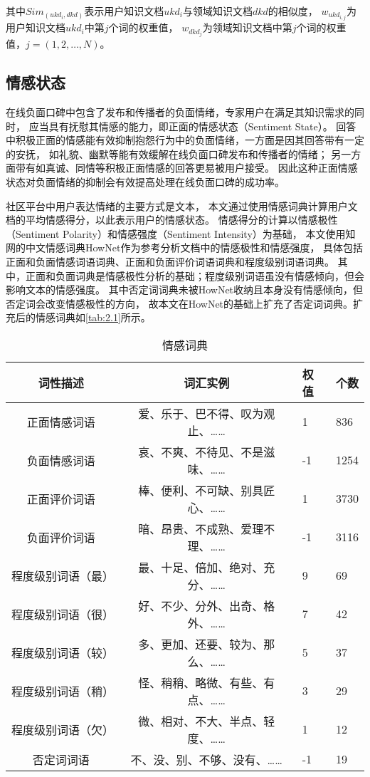 其中$Sim_{(ukd_i,dkd)}$表示用户知识文档$ukd_i$与领域知识文档$dkd$的相似度，
$w_{ { ukd_{i,j} } }$为用户知识文档$ukd_i$中第$j$个词的权重值，
$w_{ { dkd_j } }$为领域知识文档中第$j$个词的权重值，$j=(1,2,\ldots,N)$。

\subsection{情感状态}\label{subsection:2.2.2}

在线负面口碑中包含了发布和传播者的负面情绪，专家用户在满足其知识需求的同时，
应当具有抚慰其情感的能力，即正面的情感状态（Sentiment State）。
回答中积极正面的情感能有效抑制抱怨行为中的负面情绪，一方面是因其回答带有一定的安抚，
如礼貌、幽默等能有效缓解在线负面口碑发布和传播者的情绪；
另一方面带有如真诚、同情等积极正面情感的回答更易被用户接受。
因此这种正面情感状态对负面情绪的抑制会有效提高处理在线负面口碑的成功率\cite{kim2007best}。

社区平台中用户表达情绪的主要方式是文本，
本文通过使用情感词典计算用户文档的平均情感得分，以此表示用户的情感状态。
情感得分的计算以情感极性（Sentiment Polarity）和情感强度（Sentiment Intensity）为基础，
本文使用知网的中文情感词典HowNet作为参考分析文档中的情感极性和情感强度，
具体包括正面和负面情感词语词典、正面和负面评价词语词典和程度级别词语词典。
其中，正面和负面词典是情感极性分析的基础；程度级别词语虽没有情感倾向，但会影响文本的情感强度。
其中否定词词典未被HowNet收纳且本身没有情感倾向，但否定词会改变情感极性的方向，
故本文在HowNet的基础上扩充了否定词词典。扩充后的情感词典如\autoref{tab:2.1}所示。
\begin{table}[ht]
    \centering
    \caption{情感词典}\label{tab:2.1}
    \vskip -10pt
    \begin{tabularx}{\textwidth}{ccYY}
    \toprule
    词性描述 & 词汇实例 & 权值 & 个数\\
    \midrule
    正面情感词语 & 爱、乐于、巴不得、叹为观止、…… & 1 & 836\\
    负面情感词语 & 哀、不爽、不待见、不是滋味、…… & -1 & 1254 \\
    正面评价词语 & 棒、便利、不可缺、别具匠心、…… & 1 & 3730 \\
    负面评价词语 & 暗、昂贵、不成熟、爱理不理、…… & -1 & 3116 \\
    程度级别词语（最） & 最、十足、倍加、绝对、充分、…… & 9 & 69 \\
    程度级别词语（很） & 好、不少、分外、出奇、格外、…… & 7 & 42 \\
    程度级别词语（较） & 多、更加、还要、较为、那么、…… & 5 & 37 \\
    程度级别词语（稍） & 怪、稍稍、略微、有些、有点、…… & 3 & 29 \\
    程度级别词语（欠） & 微、相对、不大、半点、轻度、…… & 1 & 12 \\
    否定词词语 & 不、没、别、不够、没有、…… & -1 & 19 \\
    \bottomrule
    \end{tabularx}
\end{table}

